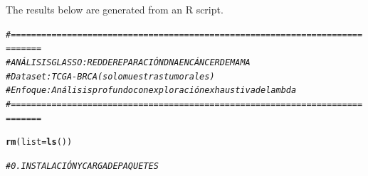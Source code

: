 \documentclass{article}\usepackage[]{graphicx}\usepackage[]{xcolor}
\makeatletter
\newcommand{\hlcom}[1]{\textcolor[rgb]{0.678,0.584,0.686}{\textit{#1}}}%
\newcommand{\hldef}[1]{\textcolor[rgb]{0.345,0.345,0.345}{#1}}%
\newcommand{\hlkwc}[1]{\textcolor[rgb]{0.333,0.667,0.333}{#1}}%
\newcommand{\hlkwd}[1]{\textcolor[rgb]{0.737,0.353,0.396}{\textbf{#1}}}%
\newenvironment{kframe}{%
 \def\at@end@of@kframe{}%
 \ifinner\ifhmode%
  \def\at@end@of@kframe{\end{minipage}}%
  \begin{minipage}{\columnwidth}%
 \fi\fi%
 \def\FrameCommand##1{\hskip\@totalleftmargin \hskip-\fboxsep
 \colorbox{shadecolor}{##1}\hskip-\fboxsep
     \hskip-\linewidth \hskip-\@totalleftmargin \hskip\columnwidth}%
 \MakeFramed {\advance\hsize-\width
   \@totalleftmargin\z@ \linewidth\hsize
   \@setminipage}}%
 {\par\unskip\endMakeFramed%
 \at@end@of@kframe}
\newenvironment{knitrout}{}{} %
\makeatother
\begin{document}
The results below are generated from an R script.

\begin{knitrout}
\color{fgcolor}\begin{kframe}
\begin{alltt}
\hlcom{# ============================================================================}
\hlcom{# ANÁLISIS GLASSO: RED DE REPARACIÓN DNA EN CÁNCER DE MAMA}
\hlcom{# Dataset: TCGA-BRCA (solo muestras tumorales)}
\hlcom{# Enfoque: Análisis profundo con exploración exhaustiva de lambda}
\hlcom{# ============================================================================}

\hlkwd{rm}\hldef{(}\hlkwc{list}\hldef{=}\hlkwd{ls}\hldef{())}
\end{alltt}
\end{kframe}
\end{knitrout}
\begin{knitrout}
\color{fgcolor}\begin{kframe}
\begin{alltt}
\hlcom{# 0. INSTALACIÓN Y CARGA DE PAQUETES}
\end{alltt}
\end{kframe}
\end{knitrout}
\end{document}
